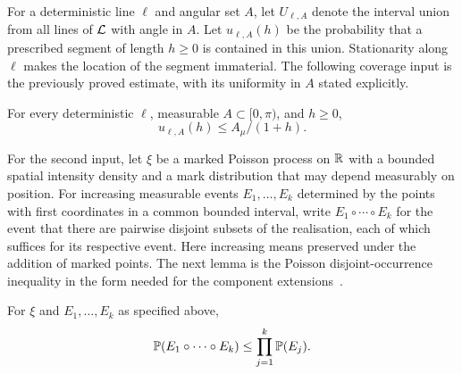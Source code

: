 \documentclass[11pt,letterpaper]{article}
\begin{document}
For a deterministic line $\ell$ and angular set $A$, let $U_{\ell,A}$ denote the interval union from all lines of $\cL$ with angle in $A$. Let $u_{\ell,A}(h)$ be the probability that a prescribed segment of length $h\ge0$ is contained in this union. Stationarity along $\ell$ makes the location of the segment immaterial. The following coverage input is the previously proved estimate, with its uniformity in $A$ stated explicitly.

\begin{lemma}\label{lem:coverage}
For every deterministic $\ell$, measurable $A\subset[0,\pi)$, and $h\ge0$,
\[
 u_{\ell,A}(h)\le A_\mu/(1+h).
\]
\end{lemma}

For the second input, let $\xi$ be a marked Poisson process on $\R$ with a bounded spatial intensity density and a mark distribution that may depend measurably on position. For increasing measurable events $E_1,\ldots,E_k$ determined by the points with first coordinates in a common bounded interval, write $E_1\circ\cdots\circ E_k$ for the event that there are pairwise disjoint subsets of the realisation, each of which suffices for its respective event. Here increasing means preserved under the addition of marked points. The next lemma is the Poisson disjoint-occurrence inequality in the form needed for the component extensions~\cite{vdB96}.

\begin{lemma}\label{lem:bk}
For $\xi$ and $E_1,\ldots,E_k$ as specified above,
\[
 \P(E_1\circ\cdots\circ E_k)\le\prod_{j=1}^k\P(E_j).
\]
\end{lemma}
\end{document}
